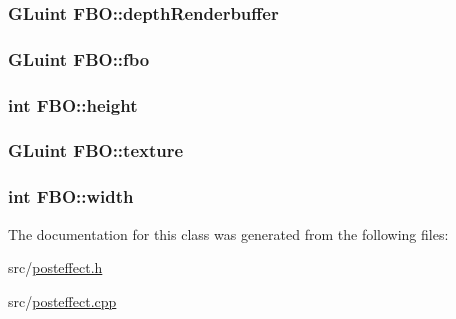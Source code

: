 \subsubsection[{depth\+Renderbuffer}]{\setlength{\rightskip}{0pt plus 5cm}G\+Luint F\+B\+O\+::depth\+Renderbuffer}\label{class_f_b_o_a0d534622dab7033e5a8c003f7eb7e468}
\hypertarget{class_f_b_o_adfc8733f55f3cfa150e03d4b7f92bae9}{}
\subsubsection[{fbo}]{\setlength{\rightskip}{0pt plus 5cm}G\+Luint F\+B\+O\+::fbo}\label{class_f_b_o_adfc8733f55f3cfa150e03d4b7f92bae9}
\hypertarget{class_f_b_o_a8d4904691fd104e8435e999e9ab17528}{}
\subsubsection[{height}]{\setlength{\rightskip}{0pt plus 5cm}int F\+B\+O\+::height}\label{class_f_b_o_a8d4904691fd104e8435e999e9ab17528}
\hypertarget{class_f_b_o_a37180796ba607460d9fd946122cb99c4}{}
\subsubsection[{texture}]{\setlength{\rightskip}{0pt plus 5cm}G\+Luint F\+B\+O\+::texture}\label{class_f_b_o_a37180796ba607460d9fd946122cb99c4}
\hypertarget{class_f_b_o_a809c6cb2cd45dc68f14d59656490d95e}{}
\subsubsection[{width}]{\setlength{\rightskip}{0pt plus 5cm}int F\+B\+O\+::width}\label{class_f_b_o_a809c6cb2cd45dc68f14d59656490d95e}


The documentation for this class was generated from the following files\+:\begin{DoxyCompactItemize}
\item 
src/\hyperlink{posteffect_8h}{posteffect.\+h}\item 
src/\hyperlink{posteffect_8cpp}{posteffect.\+cpp}\end{DoxyCompactItemize}
